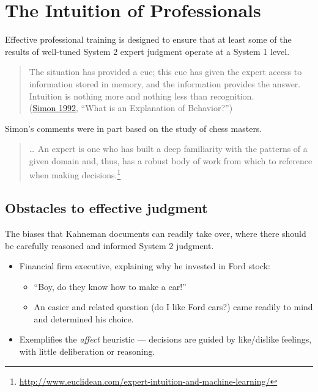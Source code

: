 \documentclass[
  10pt,
  b5paper]{book}
\providecommand{\tightlist}{%
  \setlength{\itemsep}{0pt}\setlength{\parskip}{0pt}}
\begin{document}
\hypertarget{the-intuition-of-professionals}{%
\section{The Intuition of Professionals}\label{the-intuition-of-professionals}}

Effective professional training is designed to ensure that at least
some of the results of well-tuned System 2 expert judgment operate
at a System 1 level.

\begin{quote}
The situation has provided a cue; this cue has given the expert access to information stored in memory, and the information provides the answer. Intuition is nothing more and nothing less than recognition.\\
(\protect\hyperlink{ref-simon1992explanation}{Simon 1992}, {``What is an Explanation of Behavior?''})
\end{quote}

Simon's comments were in part based on the study of chess masters.

\begin{quote}
\ldots{} An expert is one who has built a deep familiarity with the patterns of a given domain and, thus, has a robust body of work from which to reference when making decisions.\footnote{
  \url{http://www.euclidean.com/expert-intuition-and-machine-learning/}}
\end{quote}

\hypertarget{obstacles-to-effective-judgment}{%
\subsection*{Obstacles to effective judgment}\label{obstacles-to-effective-judgment}}

The biases that Kahneman documents can readily take over, where
there should be carefully reasoned and informed System 2 judgment.

\begin{itemize}
\tightlist
\item
  Financial firm executive, explaining why he invested in Ford stock:

  \begin{itemize}
  \tightlist
  \item
    ``Boy, do they know how to make a car!''
  \item
    An easier and related question (do I like Ford cars?) came
    readily to mind and determined his choice.
  \end{itemize}
\item
  Exemplifies the \emph{affect} heuristic --- decisions are guided
  by like/dislike feelings, with little deliberation or reasoning.
\end{itemize}
\end{document}
